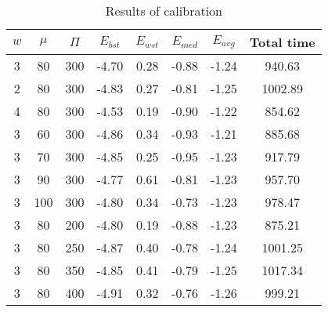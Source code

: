 \begin{table}[H]
\centering
\begin{tabular}{@{}cccccccc@{}}
\toprule
$w$ & $\mu$ & $\Pi$ & $E_{bst}$  & $E_{wst}$ & $E_{med}$ & $E_{avg}$ & Total time \\ \midrule
3   & 80    & 300   & -4.70      & 0.28      & -0.88     & -1.24     & 940.63     \\
2   & 80    & 300   & -4.83      & 0.27      & -0.81     & -1.25     & 1002.89    \\
4   & 80    & 300   & -4.53      & 0.19      & -0.90     & -1.22     & 854.62     \\
3   & 60    & 300   & -4.86      & 0.34      & -0.93     & -1.21     & 885.68     \\
3   & 70    & 300   & -4.85      & 0.25      & -0.95     & -1.23     & 917.79     \\
3   & 90    & 300   & -4.77      & 0.61      & -0.81     & -1.23     & 957.70     \\
3   & 100   & 300   & -4.80      & 0.34      & -0.73     & -1.23     & 978.47     \\
3   & 80    & 200   & -4.80      & 0.19      & -0.88     & -1.23     & 875.21     \\
3   & 80    & 250   & -4.87      & 0.40      & -0.78     & -1.24     & 1001.25    \\
3   & 80    & 350   & -4.85      & 0.41      & -0.79     & -1.25     & 1017.34    \\
3   & 80    & 400   & -4.91      & 0.32      & -0.76     & -1.26     & 999.21     \\
\bottomrule
\end{tabular}
\caption{Results of calibration}
\label{calibration-results}
\end{table}